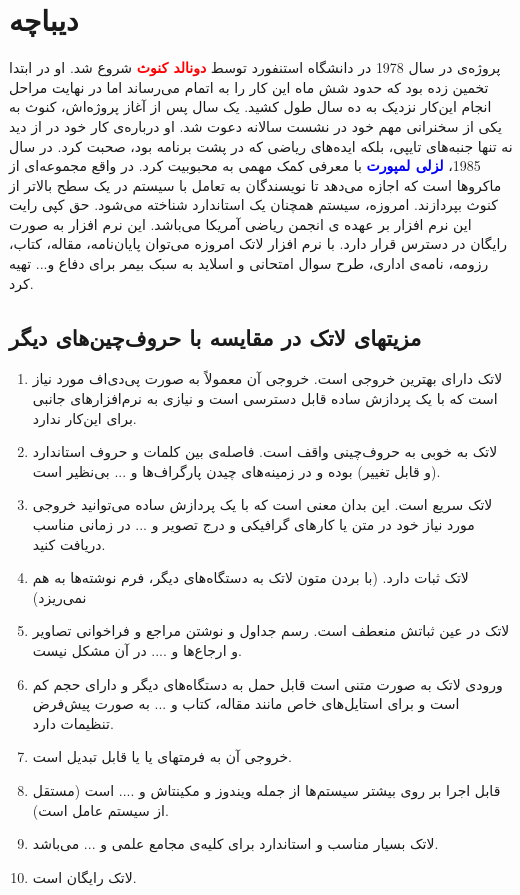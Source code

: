 \documentclass{article}
\begin{document}
\section{دیباچه}
پروژه‌ی
\lr{\TeX}
در سال 1978   در  دانشگاه استنفورد توسط 
\textcolor{red}{\textbf{دونالد کنوث}}
شروع شد.  او در ابتدا تخمین زده بود که حدود شش ماه 
این کار را به اتمام می‌رساند اما در نهایت  مراحل انجام این‌کار 
نزدیک به ده سال طول کشید.
یک سال پس از آغاز پروژه‌اش، کنوث به 
یکی از سخنرانی مهم خود در نشست سالانه 
دعوت شد. او درباره‌ی کار خود در 
\lr{\TeX}
از دید نه تنها جنبه‌های تایپی، 
بلکه ایده‌های ریاضی که در پشت برنامه بود،  صحبت  کرد.
در سال 1985،
\linebreak
\textcolor{blue}{\textbf{لزلی لمپورت}}
با معرفی 
\lr{\LaTeX}  
کمک مهمی به  محبوبیت 
\lr{\TeX}
کرد. در واقع
\lr{\LaTeX}
مجموعه‌ای از ماکروها
است که اجازه می‌دهد تا 
نویسندگان به تعامل با سیستم در یک سطح بالاتر از کنوث 
بپردازند. امروزه، سیستم 
\lr{\TeX}
همچنان یک استاندارد شناخته می‌شود. 
حق کپی رایت این نرم افزار بر عهده ی انجمن ریاضی آمریکا
می‌باشد. 
این نرم افزار به صورت رایگان در دسترس قرار دارد. با نرم 
افزار لاتک امروزه می‌توان پایان‌نامه، مقاله‌، کتاب، رزومه، نامه‌ی 
اداری‌، طرح سوال امتحانی و اسلاید به سبک بیمر برای دفاع 
و... تهیه کرد.
\subsection{مزیتها‌ی لاتک در مقایسه با حروف‌چین‌های دیگر}
\begin{enumerate}
\item 
لاتک دارای بهترین خروجی است. خروجی آن معمولاً به صورت پی‌دی‌اف مورد نیاز است که با یک پردازش ساده قابل دسترسی است و
نیازی به نرم‌افزارهای جانبی برای این‌کار ندارد.
\item 
لاتک به خوبی به حروف‌چینی واقف است. فاصله‌ی بین کلمات و حروف استاندارد (و قابل تغییر) بوده و در زمینه‌های چیدن پارگراف‌ها
و ... بی‌نظیر است.
\item 
لاتک سریع است. این بدان معنی است که با یک پردازش ساده 
می‌توانید خروجی مورد نیاز خود در متن یا کارهای گرافیکی و درج تصویر و ... در زمانی مناسب دریافت کنید.
\item 
لاتک ثبات دارد. (با بردن متون لاتک به دستگاه‌های دیگر، 
فرم نوشته‌ها به هم نمی‌ریزد)
\item 
لاتک در عین ثباتش منعطف است. 
رسم جداول و نوشتن مراجع و فراخوانی تصاویر  و ارجاع‌ها و 
.... در آن مشکل نیست.
\item 
ورودی لاتک به صورت متنی است قابل حمل به دستگاه‌های 
دیگر و دارای حجم کم است و برای استایل‌های خاص مانند مقاله،
کتاب و ... به صورت 
پیش‌فرض تنظیمات دارد.
\item 
خروجی آن به فرمتهای 
یا
یا
قابل تبدیل است.
\item 
قابل اجرا بر روی بیشتر سیستم‌ها از جمله ویندوز و
مکینتاش و .... است (مستقل از سیستم عامل است).
\item 
لاتک بسیار مناسب و استاندارد برای کلیه‌ی مجامع علمی و 
... می‌باشد.
\item
لاتک رایگان است.
\end{enumerate}
\end{document}
